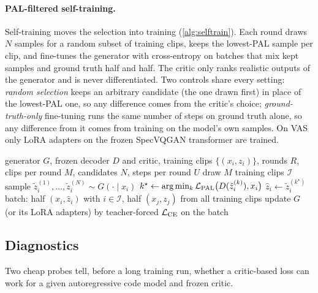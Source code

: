 \paragraph{PAL-filtered self-training.}
Self-training moves the selection into training (\cref{alg:selftrain}). Each round draws $N$ samples for a random subset of training clips, keeps the lowest-PAL sample per clip, and fine-tunes the generator with cross-entropy on batches that mix kept samples and ground truth half and half. The critic only ranks realistic outputs of the generator and is never differentiated. Two controls share every setting: \emph{random selection} keeps an arbitrary candidate (the one drawn first) in place of the lowest-PAL one, so any difference comes from the critic's choice; \emph{ground-truth-only} fine-tuning runs the same number of steps on ground truth alone, so any difference from it comes from training on the model's own samples. On VAS only LoRA adapters \citep{hu2022lora} on the frozen SpecVQGAN transformer are trained.

\begin{algorithm}[t]
  \caption{PAL-filtered self-training}
  \label{alg:selftrain}
  \small
  \begin{algorithmic}[1]
    \Require generator $G$, frozen decoder $D$ and critic, training clips $\{(x_i, z_i)\}$, rounds $R$, clips per round $M$, candidates $N$, steps per round $U$
      \State draw $M$ training clips $\mathcal{I}$
        \State sample $\tilde z_i^{(1)}, \dots, \tilde z_i^{(N)} \sim G(\cdot \mid x_i)$ 
        \State $k^\star \gets \arg\min_k \mathcal{L}_{\mathrm{PAL}}\bigl(D(\tilde z_i^{(k)}), x_i\bigr)$ 
        \State $\hat z_i \gets \tilde z_i^{(k^\star)}$
      \EndFor
        \State batch: half $(x_i, \hat z_i)$ with $i \in \mathcal{I}$, half $(x_j, z_j)$ from all training clips
        \State update $G$ (or its LoRA adapters) by teacher-forced $\mathcal{L}_{\mathrm{CE}}$ on the batch
      \EndFor
    \EndFor
  \end{algorithmic}
\end{algorithm}

\subsection{Diagnostics}
\label{sec:diagnostics}

Two cheap probes tell, before a long training run, whether a critic-based loss can work for a given autoregressive code model and frozen critic.


